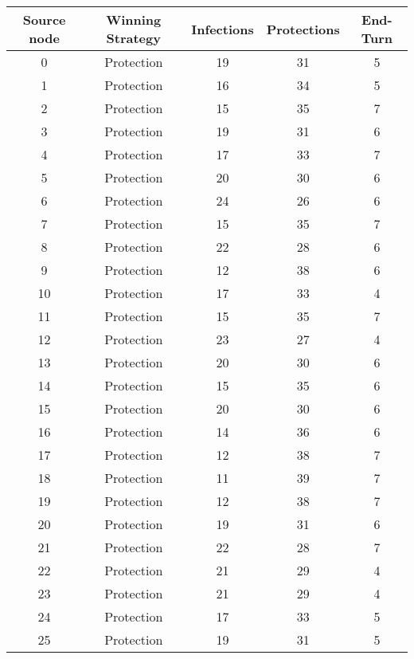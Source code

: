 \documentclass[results.tex]{subfiles}
\begin{document}
\begin{center}
  \begin{tabular}{| c || c | c | c | c |}
    \hline
    {\bfseries Source node} & {\bfseries Winning Strategy} & {\bfseries Infections} & {\bfseries Protections} & {\bfseries End-Turn} \\  %
    \hline\hline
    0 & Protection & 19 & 31 & 5 \\ 
    \hline
    1 & Protection & 16 & 34 & 5 \\ 
    \hline
    2 & Protection & 15 & 35 & 7 \\ 
    \hline
    3 & Protection & 19 & 31 & 6 \\ 
    \hline
    4 & Protection & 17 & 33 & 7 \\ 
    \hline
    5 & Protection & 20 & 30 & 6 \\ 
    \hline
    6 & Protection & 24 & 26 & 6 \\ 
    \hline
    7 & Protection & 15 & 35 & 7 \\ 
    \hline
    8 & Protection & 22 & 28 & 6 \\ 
    \hline
    9 & Protection & 12 & 38 & 6 \\ 
    \hline
    10 & Protection & 17 & 33 & 4 \\ 
    \hline
    11 & Protection & 15 & 35 & 7 \\ 
    \hline
    12 & Protection & 23 & 27 & 4 \\ 
    \hline
    13 & Protection & 20 & 30 & 6 \\ 
    \hline
    14 & Protection & 15 & 35 & 6 \\ 
    \hline
    15 & Protection & 20 & 30 & 6 \\ 
    \hline
    16 & Protection & 14 & 36 & 6 \\ 
    \hline
    17 & Protection & 12 & 38 & 7 \\ 
    \hline
    18 & Protection & 11 & 39 & 7 \\ 
    \hline
    19 & Protection & 12 & 38 & 7 \\ 
    \hline
    20 & Protection & 19 & 31 & 6 \\ 
    \hline
    21 & Protection & 22 & 28 & 7 \\ 
    \hline
    22 & Protection & 21 & 29 & 4 \\ 
    \hline
    23 & Protection & 21 & 29 & 4 \\ 
    \hline
    24 & Protection & 17 & 33 & 5 \\ 
    \hline
    25 & Protection & 19 & 31 & 5 \\ 

\end{tabular}
\end{center}
\end{document}

